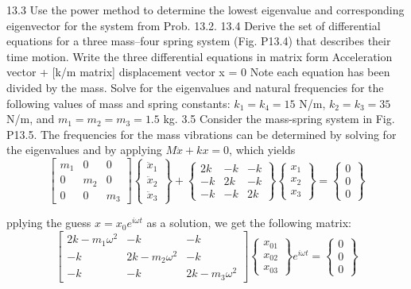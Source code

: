 \documentclass[../main.tex]{subfiles}
\begin{document}
13.3 Use the power method to determine the lowest eigenvalue and corresponding eigenvector for the system from
Prob. 13.2.
13.4 Derive the set of differential equations for a three
mass–four spring system (Fig. P13.4) that describes their time
motion. Write the three differential equations in matrix form
{Acceleration vector} + [k/m matrix]
{displacement vector x} = 0
Note each equation has been divided by the mass. Solve for
the eigenvalues and natural frequencies for the following
values of mass and spring constants: $k_{1} = k_{4} = 15$ N/m,
$k_{2} = k_{3} = 35$ N/m, and $m_{1} = m_{2} = m_{3} = 1.5$ kg.
3.5 Consider the mass-spring system in Fig. P13.5. The frequencies for the mass vibrations can be determined by solving
for the eigenvalues and by applying $M\ddot{x} + kx = 0$, which
yields
\begin{equation}
\begin{bmatrix}
m_{1} & 0 &0 \\
 0& m_{2} & 0\\
 0&0  & m_{3}
\end{bmatrix}\begin{Bmatrix}
\ddot{x}_{1}\\
\ddot{x}_{2}\\
\ddot{x}_{3}
\end{Bmatrix}+\begin{Bmatrix}
2k & -k & -k\\
-k & 2k & -k\\
 -k& -k & 2k
\end{Bmatrix}\begin{Bmatrix}
x_{1}\\
x_{2}\\
x_{3}
\end{Bmatrix}=\begin{Bmatrix}
0\\
0\\
0
\end{Bmatrix}
\end{equation}

pplying the guess $x = x_{0}e^{i \omega t}$ as a solution, we get the following matrix:
\begin{equation}
\begin{bmatrix}
2k-m_{1}\omega^{2} &-k  & -k\\
 -k& 2k-m_{2}\omega^{2} & -k\\
-k & -k & 2k-m_{3}\omega^{2}
\end{bmatrix}\begin{Bmatrix}
x_{01}\\
x_{02}\\
x_{03}
\end{Bmatrix}e^{i \omega t}=\begin{Bmatrix}
0\\
0\\
0
\end{Bmatrix}
\end{equation}
\end{document}
